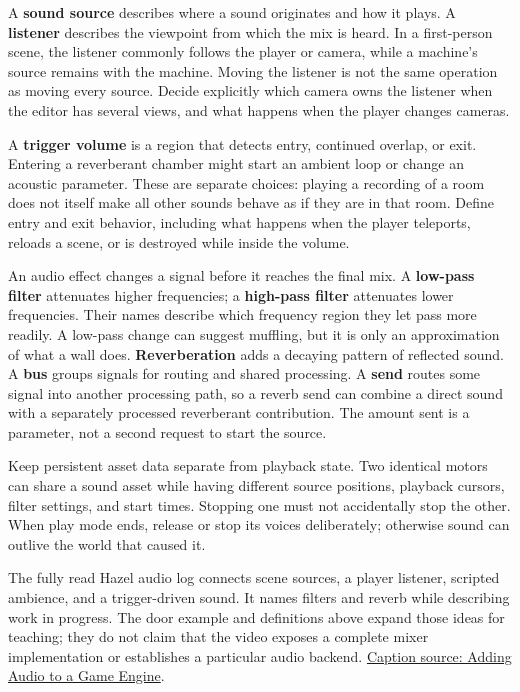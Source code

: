 A \textbf{sound source} describes where a sound originates and how it plays. A \textbf{listener} describes the viewpoint from which the mix is heard. In a first-person scene, the listener commonly follows the player or camera, while a machine's source remains with the machine. Moving the listener is not the same operation as moving every source. Decide explicitly which camera owns the listener when the editor has several views, and what happens when the player changes cameras.

A \textbf{trigger volume} is a region that detects entry, continued overlap, or exit. Entering a reverberant chamber might start an ambient loop or change an acoustic parameter. These are separate choices: playing a recording of a room does not itself make all other sounds behave as if they are in that room. Define entry and exit behavior, including what happens when the player teleports, reloads a scene, or is destroyed while inside the volume.

An audio effect changes a signal before it reaches the final mix. A \textbf{low-pass filter} attenuates higher frequencies; a \textbf{high-pass filter} attenuates lower frequencies. Their names describe which frequency region they let pass more readily. A low-pass change can suggest muffling, but it is only an approximation of what a wall does. \textbf{Reverberation} adds a decaying pattern of reflected sound. A \textbf{bus} groups signals for routing and shared processing. A \textbf{send} routes some signal into another processing path, so a reverb send can combine a direct sound with a separately processed reverberant contribution. The amount sent is a parameter, not a second request to start the source.

Keep persistent asset data separate from playback state. Two identical motors can share a sound asset while having different source positions, playback cursors, filter settings, and start times. Stopping one must not accidentally stop the other. When play mode ends, release or stop its voices deliberately; otherwise sound can outlive the world that caused it.

The fully read Hazel audio log connects scene sources, a player listener, scripted ambience, and a trigger-driven sound. It names filters and reverb while describing work in progress. The door example and definitions above expand those ideas for teaching; they do not claim that the video exposes a complete mixer implementation or establishes a particular audio backend. \href{https://www.youtube.com/watch?v=BmGHojuQMbk}{Caption source: Adding Audio to a Game Engine}.

